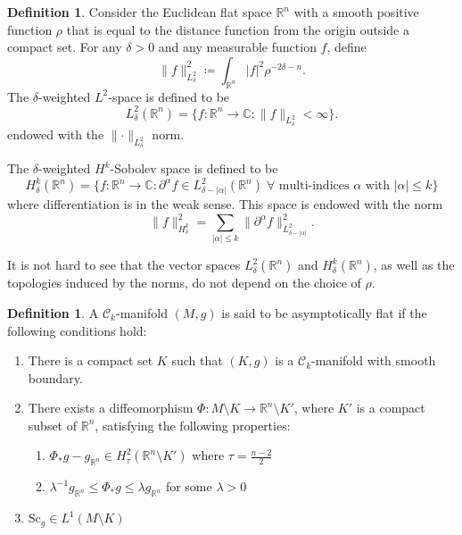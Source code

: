 \documentclass[12pt, reqno]{amsart}
\theoremstyle{plain} %
\theoremstyle{definition}
\newtheorem{definition}[theorem]{Definition}
\theoremstyle{remark}
\numberwithin{equation}{section}
\newcommand{\norm}[1]{\lVert #1 \rVert}
\newcommand{\cat}[1]{\mathcal{#1}}
\newcommand{\field}[1]{\mathbb{#1}}
\newcommand{\abs}[1]{\lvert #1 \rvert}
\newcommand{\R}{\field{R}}
\newcommand{\C}{\field{C}}
\newcommand{\Sc}{\mathrm{Sc}}
\newcommand{\tdim}{n} %
\begin{document}
\begin{definition}
    Consider the Euclidean flat space \(\R^n\) with a smooth positive function \(\rho\) that is equal to the distance function from the origin outside a compact set.
    For any \(\delta > 0\) and any measurable function \(f\), define
    \begin{equation*}
        \norm{f}_{L_{\delta}^2}^2 \coloneqq \int_{\R^n} \abs{f}^2 \rho^{-2 \delta - n}.
    \end{equation*}
    The \(\delta\)-weighted \(L^2\)-space is defined to be
    \begin{equation*}
        L_{\delta}^2(\R^n) = \{f \colon \R^n \to \C : \norm{f}_{L_{\delta}^2} < \infty\}.
    \end{equation*}
    endowed with the \(\norm{\cdot}_{L_\delta^2}\) norm.

    The \(\delta\)-weighted \(H^k\)-Sobolev space is defined to be
    \begin{equation*}
        H_{\delta}^k(\R^\tdim) = \{f \colon \R^n \to \C : \partial^{\alpha} f \in L_{\delta - \abs{\alpha}}^2(\R^n) \;\forall \text{ multi-indices \(\alpha\) with \(\abs{\alpha} \leq k\)}\}
    \end{equation*}
    where differentiation is in the weak sense.
    This space is endowed with the norm
    \begin{equation*}
        \norm{f}_{H^k_\delta}^2 = \sum_{\abs{\alpha} \leq k} \norm{\partial^\alpha f}_{L_{\delta - \abs{\alpha}}^2}^2.
    \end{equation*}
\end{definition}
It is not hard to see that the vector spaces \(L_{\delta}^2(\R^\tdim)\) and \(H_\delta^k(\R^\tdim)\), as well as the topologies induced by the norms, do not depend on the choice of \(\rho\).

\begin{definition}
    A \(\cat{C}_k\)-manifold \((M,g)\) is said to be asymptotically flat if the following conditions hold:
    \begin{enumerate}[label=(\arabic*)]
        \item There is a compact set \(K\) such that \((K,g)\) is a \(\cat{C}_k\)-manifold with smooth boundary.
        \item There exists a diffeomorphism \(\Phi \colon M \setminus K \to \R^n \setminus K'\), where \(K'\) is a compact subset of \(\R^n\), satisfying the following properties:
        \begin{enumerate}
            \item \(\Phi_* g - g_{\R^n} \in H_\tau^2(\R^n \setminus K')\) where \(\tau = \frac{n-2}{2}\)
            \item \(\lambda^{-1} g_{\R^n} \leq \Phi_*g \leq \lambda g_{\R^n}\) for some \(\lambda > 0\)
        \end{enumerate}

        \item \(\Sc_g \in L^1(M \setminus K)\)
    \end{enumerate}
\end{definition}
\end{document}

